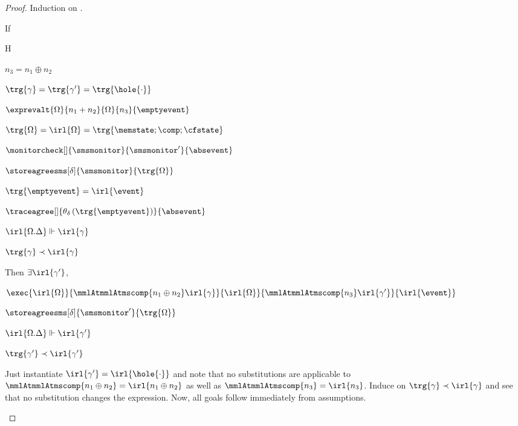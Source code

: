 \documentclass[a4paper,names,dvipsnames]{article}
\begin{document}
\begin{proof}
  Induction on .

  \begin{description}
          If
          \begin{passumptions}{H}
            \item $n_{3}=n_{1}\oplus n_{2}$
            \item $\trg{\gamma}=\trg{\gamma'}=\trg{\hole{\cdot}}$
            \item $\exprevalt{\Omega}{n_{1}+n_{2}}{\Omega}{n_{3}}{\emptyevent}$
            \item $\trg{\Omega}=\irl{\Omega}=\trg{\memstate;\comp;\cfstate}$
            \item $\monitorcheck[]{\smsmonitor}{\smsmonitor'}{\absevent}$
            \item $\storeagreesms[\delta]{\smsmonitor}{\trg{\Omega}}$
            \item $\trg{\emptyevent}=\irl{\event}$
            \item $\traceagree[]{\theta_{\delta}\left(\trg{\emptyevent}\right)}{\absevent}$
            \item $\irl{\Omega.\Delta}\Vdash\irl{\gamma}$
            \item $\trg{\gamma}\prec\irl{\gamma}$
          \end{passumptions}
          Then $\exists \irl{\gamma'}$,
          \begin{goals}
            \item $\exec{\irl{\Omega}}{\mmlAtmmlAtmscomp{n_{1}\oplus n_{2}}\irl{\gamma}}{\irl{\Omega}}{\mmlAtmmlAtmscomp{n_{3}}\irl{\gamma'}}{\irl{\event}}$
            \item $\storeagreesms[\delta]{\smsmonitor'}{\trg{\Omega}}$
            \item $\irl{\Omega.\Delta}\Vdash\irl{\gamma'}$
            \item $\trg{\gamma'}\prec\irl{\gamma'}$
          \end{goals}
          Just instantiate $\irl{\gamma'}=\irl{\hole{\cdot}}$ and note that no substitutions are applicable to $\mmlAtmmlAtmscomp{n_{1}\oplus n_{2}}=\irl{n_{1}\oplus n_{2}}$ as well as $\mmlAtmmlAtmscomp{n_{3}}=\irl{n_{3}}$.
          Induce on $\trg{\gamma}\prec\irl{\gamma}$ and see that no substitution changes the expression.
          Now, all goals follow immediately from assumptions.


\end{description}
\end{proof}
\end{document}
